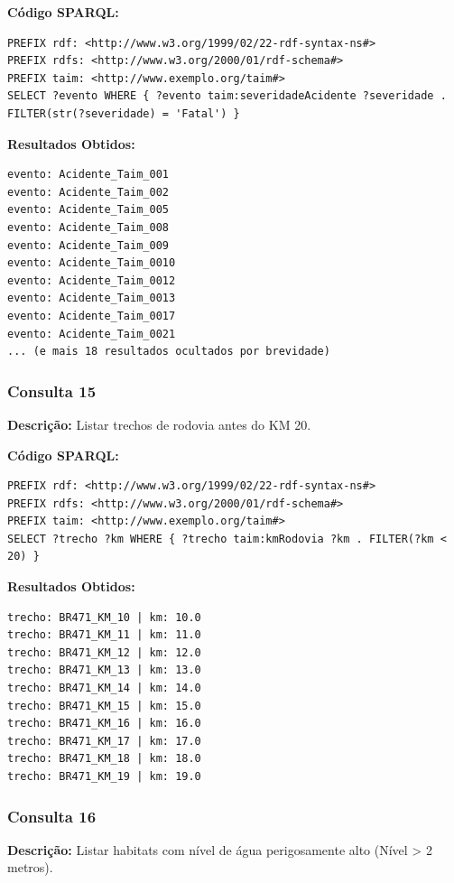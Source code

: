 \documentclass[12pt,a4paper]{article}
\begin{document}
\textbf{Código SPARQL:}
\begin{lstlisting}
PREFIX rdf: <http://www.w3.org/1999/02/22-rdf-syntax-ns#>
PREFIX rdfs: <http://www.w3.org/2000/01/rdf-schema#>
PREFIX taim: <http://www.exemplo.org/taim#>
SELECT ?evento WHERE { ?evento taim:severidadeAcidente ?severidade . FILTER(str(?severidade) = 'Fatal') }
\end{lstlisting}

\textbf{Resultados Obtidos:}
\begin{lstlisting}
evento: Acidente_Taim_001
evento: Acidente_Taim_002
evento: Acidente_Taim_005
evento: Acidente_Taim_008
evento: Acidente_Taim_009
evento: Acidente_Taim_0010
evento: Acidente_Taim_0012
evento: Acidente_Taim_0013
evento: Acidente_Taim_0017
evento: Acidente_Taim_0021
... (e mais 18 resultados ocultados por brevidade)
\end{lstlisting}

\vspace{1cm}
\subsubsection*{Consulta 15}

\textbf{Descrição:} Listar trechos de rodovia antes do KM 20.

\textbf{Código SPARQL:}
\begin{lstlisting}
PREFIX rdf: <http://www.w3.org/1999/02/22-rdf-syntax-ns#>
PREFIX rdfs: <http://www.w3.org/2000/01/rdf-schema#>
PREFIX taim: <http://www.exemplo.org/taim#>
SELECT ?trecho ?km WHERE { ?trecho taim:kmRodovia ?km . FILTER(?km < 20) }
\end{lstlisting}

\textbf{Resultados Obtidos:}
\begin{lstlisting}
trecho: BR471_KM_10 | km: 10.0
trecho: BR471_KM_11 | km: 11.0
trecho: BR471_KM_12 | km: 12.0
trecho: BR471_KM_13 | km: 13.0
trecho: BR471_KM_14 | km: 14.0
trecho: BR471_KM_15 | km: 15.0
trecho: BR471_KM_16 | km: 16.0
trecho: BR471_KM_17 | km: 17.0
trecho: BR471_KM_18 | km: 18.0
trecho: BR471_KM_19 | km: 19.0
\end{lstlisting}

\vspace{1cm}
\subsubsection*{Consulta 16}

\textbf{Descrição:} Listar habitats com nível de água perigosamente alto (Nível > 2 metros).
\end{document}
